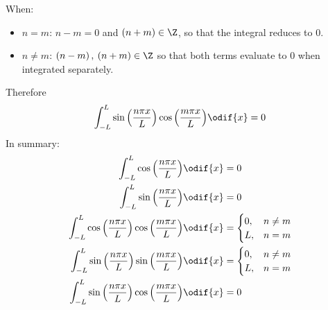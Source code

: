 \documentclass{article}
\begin{document}
When:
\begin{itemize}
    \item \(n = m\): \(n - m = 0\) and \(\left( n + m \right) \in \Z\), so that the integral reduces to \(0\).
    \item \(n \neq m\): \(\left( n - m \right),\: \left( n + m \right) \in \Z\) so that both terms evaluate to \(0\) when integrated separately.
\end{itemize}
Therefore
\begin{equation*}
    \int_{-L}^L \sin{\left( \frac{n \pi x}{L} \right)} \cos{\left( \frac{m \pi x}{L} \right)} \odif{x} = 0
\end{equation*}
In summary:
\begin{align}
    \int_{-L}^L \cos{\left( \frac{n \pi x}{L} \right)} \odif{x}                                        & = 0 \label{eq:cosine} \\
    \int_{-L}^L \sin{\left( \frac{n \pi x}{L} \right)} \odif{x}                                        & = 0 \label{eq:sine}   \\
    \int_{-L}^L \cos{\left( \frac{n \pi x}{L} \right)} \cos{\left( \frac{m \pi x}{L} \right)} \odif{x} & = \begin{cases}
                                                                                                               0, & n \neq m \\
                                                                                                               L, & n = m
                                                                                                           \end{cases}       \\
    \int_{-L}^L \sin{\left( \frac{n \pi x}{L} \right)} \sin{\left( \frac{m \pi x}{L} \right)} \odif{x} & = \begin{cases}
                                                                                                               0, & n \neq m \\
                                                                                                               L, & n = m
                                                                                                           \end{cases}       \\
    \int_{-L}^L \sin{\left( \frac{n \pi x}{L} \right)} \cos{\left( \frac{m \pi x}{L} \right)} \odif{x} & = 0
\end{align}
\end{document}
